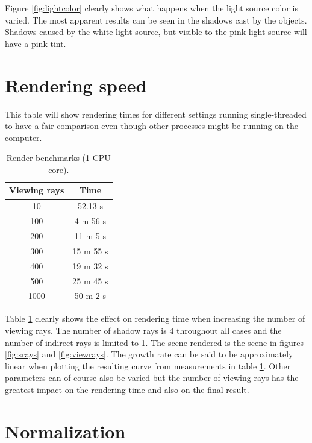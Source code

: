 \documentclass[a4paper]{report}
\begin{document}
Figure \ref{fig:lightcolor} clearly shows what happens when the light
source color is varied. The most apparent results can be seen in the
shadows cast by the objects. Shadows caused by the white light source,
but visible to the pink light source will have a pink tint.

\section{Rendering speed}

This table will show rendering times for different settings running
single-threaded to have a fair comparison even though other processes
might be running on the computer.

\begin{table}[htbp]
  \begin{center}
    \begin{tabular}{ | c | c | }
      \hline
      Viewing rays & Time \\
      \hline
      10   & 52.13 s \\
      100    & 4 m 56 s \\
      200    & 11 m 5 s \\
      300    & 15 m 55 s \\
      400    & 19 m 32 s \\
      500 & 25 m 45 s \\
      1000  & 50 m 2 s  \\
      \hline
    \end{tabular}
    \caption{Render benchmarks (1 CPU core).}
    \label{tab:results}
  \end{center}
\end{table}

Table \ref{tab:results} clearly shows the effect on rendering time when increasing the
number of viewing rays. The number of shadow rays is 4 throughout all
cases and the number of indirect rays is limited to 1. The scene
rendered is the scene in figures \ref{fig:srays} and
\ref{fig:viewrays}. The growth rate can be said to be approximately
linear when plotting the resulting curve from measurements in table \ref{tab:results}. Other parameters can of
course also be varied but the number of viewing rays has the greatest
impact on the rendering time and also on the final result.

\pagebreak

\section{Normalization}
\end{document}
